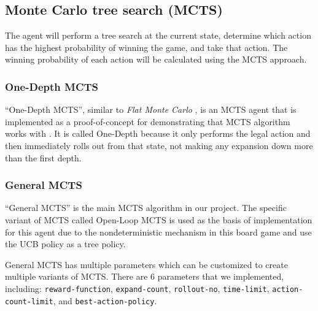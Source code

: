 \subsection{Monte Carlo tree search (MCTS)} %
The agent will perform a tree search at the current state, determine which action has the highest probability of winning the game, and take that action. The winning probability of each action will be calculated using the MCTS approach.


\subsubsection{One-Depth MCTS}
``One-Depth MCTS'', similar to \textit{Flat Monte Carlo} \cite{mcts-survey}, is an MCTS agent that is implemented as a proof-of-concept for demonstrating that MCTS algorithm works with \RootB{}. It is called One-Depth because it only performs the legal action and then immediately rolls out from that state, not making any expansion down more than the first depth.

\subsubsection{General MCTS}
``General MCTS'' is the main MCTS algorithm in our project. The specific variant of MCTS called Open-Loop MCTS is used as the basis of implementation for this agent due to the nondeterministic mechanism in this board game and use the UCB policy as a tree policy.

General MCTS has multiple parameters which can be customized to create multiple variants of MCTS. There are 6 parameters that we implemented, including: \texttt{reward-function}, \texttt{expand-count}, \texttt{rollout-no}, \texttt{time-limit}, \texttt{action-count-limit}, and \texttt{best-action-policy}.

